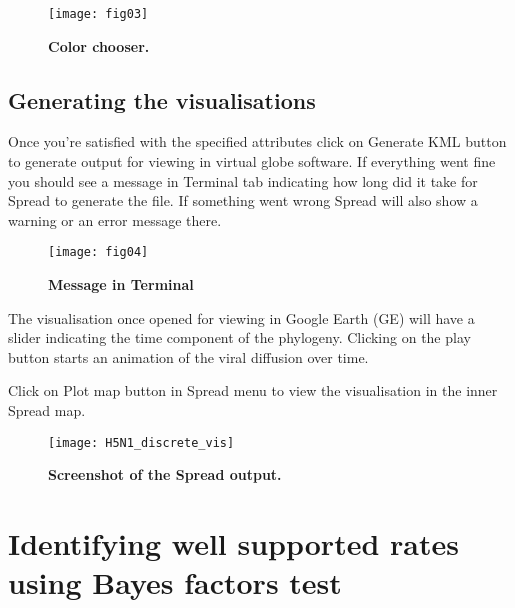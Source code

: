 \begin{figure}[H]
\begin{centering}
\texttt{[image: fig03]}
\caption{
{ \footnotesize 
{\bf Color chooser.}
} %
}
\label{fig:03}
\par\end{centering}
\end{figure}


\subsection{Generating the visualisations}

Once you're satisfied with the specified attributes click on Generate
KML button to generate output for viewing in virtual globe software.
If everything went fine you should see a message in Terminal tab indicating
how long did it take for Spread to generate the file. If something
went wrong Spread will also show a warning or an error message there.


\begin{figure}[H]
\begin{centering}
\texttt{[image: fig04]}
\caption{
{ \footnotesize 
{\bf Message in Terminal}
} %
}
\label{fig:04}
\par\end{centering}
\end{figure}

The visualisation once opened for viewing in Google Earth (GE) will
have a slider indicating the time component of the phylogeny. Clicking
on the play button starts an animation of the viral diffusion over
time. 

Click on Plot map button in Spread menu to view the visualisation
in the inner Spread map. 


\begin{figure}[H]
\begin{centering}
\texttt{[image: H5N1\_discrete\_vis]}
\caption{
{ \footnotesize 
{\bf Screenshot of the Spread output.}
} %
}
\label{fig:05}
\par\end{centering}
\end{figure}

\section{Identifying well supported rates using Bayes factors test}

